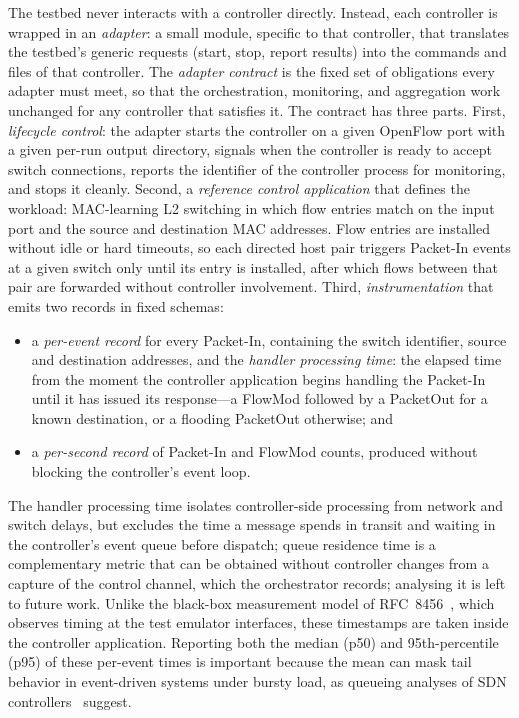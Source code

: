 \documentclass[conference]{IEEEtran}
\begin{document}
The testbed never interacts with a controller directly. Instead,
each controller is wrapped in an \emph{adapter}: a small module,
specific to that controller, that translates the testbed's generic
requests (start, stop, report results) into the commands and files
of that controller. The \emph{adapter contract} is the fixed set
of obligations every adapter must meet, so that the orchestration,
monitoring, and aggregation work unchanged for any controller that
satisfies it. The contract has three parts. First,
\emph{lifecycle control}: the
adapter starts the controller on a given OpenFlow port with a
given per-run output directory, signals when the controller is
ready to accept switch connections, reports the identifier of the
controller process for monitoring, and stops it cleanly. Second, a \emph{reference
control application} that defines the workload: MAC-learning L2
switching in which flow entries match on the input port and the
source and destination MAC addresses. Flow entries are installed
without idle or hard timeouts, so each directed host
pair triggers Packet-In events at a given switch only until its
entry is installed, after which flows between that pair are
forwarded without controller involvement. Third,
\emph{instrumentation} that emits two records in fixed schemas:

\begin{itemize}
  \item a \emph{per-event record} for every Packet-In, containing
  the switch identifier, source and destination addresses, and
  the \emph{handler processing time}: the elapsed time from the
  moment the controller application begins handling the
  Packet-In until it has issued its response---a FlowMod
  followed by a PacketOut for a known destination, or a flooding
  PacketOut otherwise; and
  \item a \emph{per-second record} of Packet-In and FlowMod
  counts, produced without blocking the controller's event loop.
\end{itemize}

The handler processing time isolates controller-side processing
from network and switch delays, but excludes the time a message
spends in transit and waiting in the controller's event queue
before dispatch; queue residence time is a complementary metric
that can be obtained without controller changes from a capture of
the control channel, which the orchestrator records; analysing it
is left to future work. Unlike the black-box measurement model of
RFC~8456~\cite{rfc8456}, which observes timing at the test
emulator interfaces, these timestamps are taken inside the
controller application. Reporting both the median (p50) and
95th-percentile (p95) of these per-event times is important
because the mean can mask tail behavior in event-driven systems
under bursty load, as queueing analyses of SDN
controllers~\cite{Xiong2016QueueingSDN} suggest.
\end{document}
